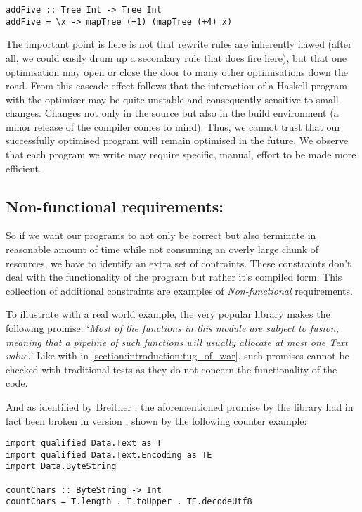 \begin{verbatim}
addFive :: Tree Int -> Tree Int
addFive = \x -> mapTree (+1) (mapTree (+4) x)
\end{verbatim}

The important point is here is not that rewrite rules are inherently flawed (after all, we could easily
drum up a secondary rule that does fire here), but that one optimisation
may open or close the door to many other optimisations down the road.
From this cascade effect follows that the interaction of a Haskell program
with the optimiser may be quite unstable and consequently sensitive to small changes. 
Changes not only in the source but also in the build environment (a minor release of
the compiler comes to mind). Thus, we cannot trust that our successfully optimised program will remain
optimised in the future. We observe that each program we write may require specific, manual, 
effort to be made more efficient.

\subsection{Non-functional requirements: }
\label{section:introduction_inspection_testing}

So if we want our programs to not only be correct but also terminate in reasonable amount of time while
not consuming an overly large chunk of resources, we have to identify an extra set of contraints. 
These constraints don't deal with the functionality of the program but rather it's compiled form.
This collection of additional constraints are examples of \textit{Non-functional} requirements. 

To illustrate with a real world example, the very popular  library makes the following promise:
`\textit{Most of the functions in this module are subject to fusion, meaning that a pipeline of such functions will usually allocate at most one Text value.}'
\cite{inspection_testing}
Like with  in \cref{section:introduction:tug_of_war}, 
such promises cannot be checked with traditional tests as they do not concern the functionality of the code. 

And as identified by Breitner \cite{inspection_testing}, the aforementioned promise by the  library had in fact
been broken in version , shown by the following counter example:

\begin{verbatim}
import qualified Data.Text as T
import qualified Data.Text.Encoding as TE
import Data.ByteString

countChars :: ByteString -> Int
countChars = T.length . T.toUpper . TE.decodeUtf8
\end{verbatim}

